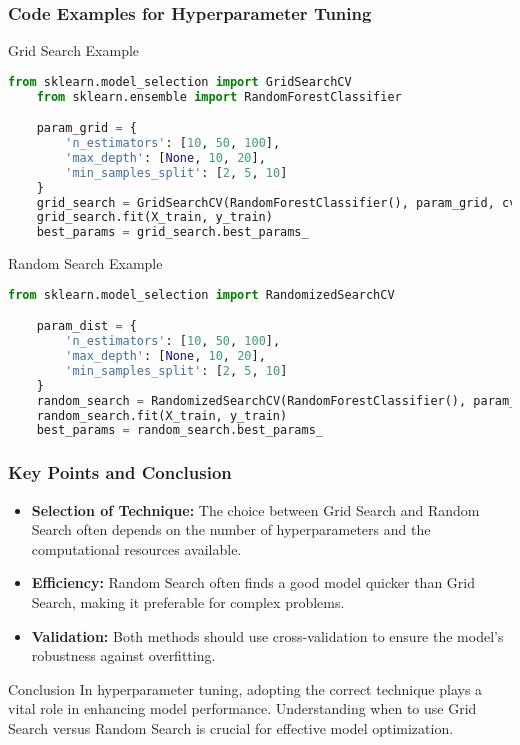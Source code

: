 \documentclass[aspectratio=169]{beamer}
\begin{document}
\begin{frame}[fragile]
    \frametitle{Code Examples for Hyperparameter Tuning}
    \begin{block}{Grid Search Example}
    \begin{lstlisting}[language=Python]
    from sklearn.model_selection import GridSearchCV
    from sklearn.ensemble import RandomForestClassifier

    param_grid = {
        'n_estimators': [10, 50, 100],
        'max_depth': [None, 10, 20],
        'min_samples_split': [2, 5, 10]
    }
    grid_search = GridSearchCV(RandomForestClassifier(), param_grid, cv=5)
    grid_search.fit(X_train, y_train)
    best_params = grid_search.best_params_
    \end{lstlisting}
    \end{block}

    \begin{block}{Random Search Example}
    \begin{lstlisting}[language=Python]
    from sklearn.model_selection import RandomizedSearchCV

    param_dist = {
        'n_estimators': [10, 50, 100],
        'max_depth': [None, 10, 20],
        'min_samples_split': [2, 5, 10]
    }
    random_search = RandomizedSearchCV(RandomForestClassifier(), param_dist, n_iter=10, cv=5)
    random_search.fit(X_train, y_train)
    best_params = random_search.best_params_
    \end{lstlisting}
    \end{block}
\end{frame}

\begin{frame}[fragile]
    \frametitle{Key Points and Conclusion}
    \begin{itemize}
        \item \textbf{Selection of Technique:} 
        The choice between Grid Search and Random Search often depends on the number of hyperparameters and the computational resources available. 
        \item \textbf{Efficiency:} 
        Random Search often finds a good model quicker than Grid Search, making it preferable for complex problems.
        \item \textbf{Validation:} 
        Both methods should use cross-validation to ensure the model's robustness against overfitting.
    \end{itemize}
    
    \begin{block}{Conclusion}
        In hyperparameter tuning, adopting the correct technique plays a vital role in enhancing model performance. Understanding when to use Grid Search versus Random Search is crucial for effective model optimization.
    \end{block}
\end{frame}
\end{document}

